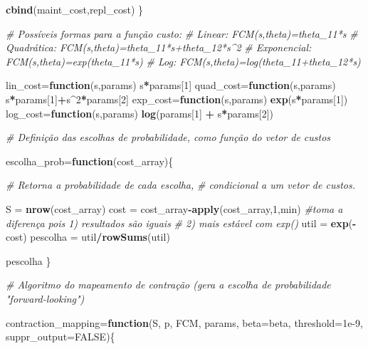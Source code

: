 \documentclass[12pt,a4paper]{article}
\newenvironment{Shaded}{\begin{snugshade}}{\end{snugshade}}
\newcommand{\CommentTok}[1]{\textcolor[rgb]{0.56,0.35,0.01}{\textit{#1}}}
\newcommand{\ControlFlowTok}[1]{\textcolor[rgb]{0.13,0.29,0.53}{\textbf{#1}}}
\newcommand{\DataTypeTok}[1]{\textcolor[rgb]{0.13,0.29,0.53}{#1}}
\newcommand{\DecValTok}[1]{\textcolor[rgb]{0.00,0.00,0.81}{#1}}
\newcommand{\FloatTok}[1]{\textcolor[rgb]{0.00,0.00,0.81}{#1}}
\newcommand{\KeywordTok}[1]{\textcolor[rgb]{0.13,0.29,0.53}{\textbf{#1}}}
\newcommand{\NormalTok}[1]{#1}
\newcommand{\OperatorTok}[1]{\textcolor[rgb]{0.81,0.36,0.00}{\textbf{#1}}}
\newcommand{\OtherTok}[1]{\textcolor[rgb]{0.56,0.35,0.01}{#1}}
\newcommand{\StringTok}[1]{\textcolor[rgb]{0.31,0.60,0.02}{#1}}
\begin{document}
\begin{Shaded}
\begin{Highlighting}[]
{{{{{  \KeywordTok{cbind}\NormalTok{(maint_cost,repl_cost)}
\NormalTok{\}}

\CommentTok{# Possíveis formas para a função custo:}
\CommentTok{# Linear: FCM(s,theta)=theta_11*s}
\CommentTok{# Quadrática: FCM(s,theta)=theta_11*s+theta_12*s^2}
\CommentTok{# Exponencial: FCM(s,theta)=exp(theta_11*s)}
\CommentTok{# Log: FCM(s,theta)=log(theta_11+theta_12*s)}

\NormalTok{lin_cost=}\ControlFlowTok{function}\NormalTok{(s,params) s}\OperatorTok{*}\NormalTok{params[}\DecValTok{1}\NormalTok{]}
\NormalTok{quad_cost=}\ControlFlowTok{function}\NormalTok{(s,params) s}\OperatorTok{*}\NormalTok{params[}\DecValTok{1}\NormalTok{]}\OperatorTok{+}\NormalTok{s}\OperatorTok{^}\DecValTok{2}\OperatorTok{*}\NormalTok{params[}\DecValTok{2}\NormalTok{]}
\NormalTok{exp_cost=}\ControlFlowTok{function}\NormalTok{(s,params) }\KeywordTok{exp}\NormalTok{(s}\OperatorTok{*}\NormalTok{params[}\DecValTok{1}\NormalTok{])}
\NormalTok{log_cost=}\ControlFlowTok{function}\NormalTok{(s,params) }\KeywordTok{log}\NormalTok{(params[}\DecValTok{1}\NormalTok{] }\OperatorTok{+}\StringTok{ }\NormalTok{s}\OperatorTok{*}\NormalTok{params[}\DecValTok{2}\NormalTok{])}

\CommentTok{# Definição das escolhas de probabilidade, como função do vetor de custos}

\NormalTok{escolha_prob=}\ControlFlowTok{function}\NormalTok{(cost_array)\{}
  
  \CommentTok{# Retorna a probabilidade de cada escolha, }
  \CommentTok{# condicional a um vetor de custos.}
  
\NormalTok{  S =}\StringTok{ }\KeywordTok{nrow}\NormalTok{(cost_array)}
\NormalTok{  cost =}\StringTok{ }\NormalTok{cost_array}\OperatorTok{-}\KeywordTok{apply}\NormalTok{(cost_array,}\DecValTok{1}\NormalTok{,min) }\CommentTok{#toma a diferença pois 1) resultados são iguais}
                                            \CommentTok{# 2) mais estável com exp()}
\NormalTok{  util =}\StringTok{ }\KeywordTok{exp}\NormalTok{(}\OperatorTok{-}\NormalTok{cost)}
\NormalTok{  pescolha =}\StringTok{ }\NormalTok{util}\OperatorTok{/}\KeywordTok{rowSums}\NormalTok{(util)}
  
\NormalTok{  pescolha}
\NormalTok{\}}

\CommentTok{# Algoritmo do mapeamento de contração (gera a escolha de probabilidade "forward-looking")}

\NormalTok{contraction_mapping=}\ControlFlowTok{function}\NormalTok{(S, p, FCM, params, }\DataTypeTok{beta=}\NormalTok{beta, }\DataTypeTok{threshold=}\FloatTok{1e-9}\NormalTok{, }\DataTypeTok{suppr_output=}\OtherTok{FALSE}\NormalTok{)\{}
  
}}}}}
\end{Highlighting}
\end{Shaded}
\end{document}
